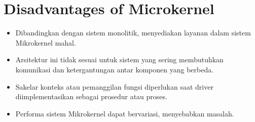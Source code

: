 \documentclass{report}
\begin{document}
	\section*{Disadvantages of Microkernel}
	
	\begin{itemize}
		\item Dibandingkan dengan sistem monolitik, menyediakan layanan dalam sistem Mikrokernel mahal.
		
		\item Arsitektur ini tidak sesuai untuk sistem yang sering membutuhkan komunikasi dan ketergantungan antar komponen yang berbeda.
		
		\item Sakelar konteks atau pemanggilan fungsi diperlukan saat driver diimplementasikan sebagai prosedur atau proses.
		
		\item Performa sistem Mikrokernel dapat bervariasi, menyebabkan masalah.
	\end{itemize}
	
\end{document}
